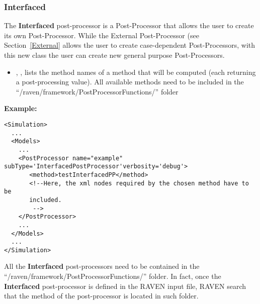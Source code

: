 %

\subsubsection{Interfaced}
\label{Interfaced}
The \textbf{Interfaced} post-processor is a Post-Processor that allows the user
to create its own Post-Processor. While the External Post-Processor (see
Section~\ref{External} allows the user to create case-dependent
Post-Processors, with this new class the user can create new general
purpose Post-Processors.
%


\begin{itemize}
  \item {}, ,
  lists the method names of a method that will be computed (each
  returning a post-processing value). All available methods need to be included
  in the ``/raven/framework/PostProcessorFunctions/'' folder
\end{itemize}

\textbf{Example:}
\begin{lstlisting}[style=XML,morekeywords={subType,debug,name,class,type}]
<Simulation>
  ...
  <Models>
    ...
    <PostProcessor name="example" subType='InterfacedPostProcessor'verbosity='debug'>
       <method>testInterfacedPP</method>
       <!--Here, the xml nodes required by the chosen method have to be
       included.
        -->
    </PostProcessor>
    ...
  </Models>
  ...
</Simulation>
\end{lstlisting}

All the \textbf{Interfaced} post-processors need to be contained in the
``/raven/framework/PostProcessorFunctions/'' folder. In fact, once the
\textbf{Interfaced} post-processor is defined in the RAVEN input file, RAVEN
search that the method of the post-processor is located in such folder.

